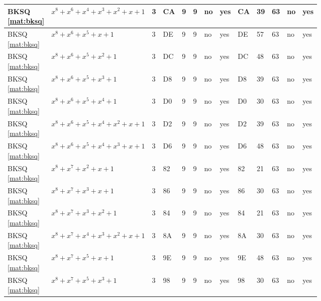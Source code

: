 \begin{tiny}
\begin{longtable}{|l|l|l|l|l|l|l|l|l|l|l|l|l|}
\shortstack{BKSQ \\ \eqref{mat:bksq}} & $x^8 + x^6 + x^4 + x^3 + x^2 + x + 1$ & 3 & CA & 9 & 9 & no & yes & CA & 39 & 63 & no & yes \\ \hline
\shortstack{BKSQ \\ \eqref{mat:bksq}} & $x^8 + x^6 + x^5 + x + 1$ & 3 & DE & 9 & 9 & no & yes & DE & 57 & 63 & no & yes \\ \hline
\shortstack{BKSQ \\ \eqref{mat:bksq}} & $x^8 + x^6 + x^5 + x^2 + 1$ & 3 & DC & 9 & 9 & no & yes & DC & 48 & 63 & no & yes \\ \hline
\shortstack{BKSQ \\ \eqref{mat:bksq}} & $x^8 + x^6 + x^5 + x^3 + 1$ & 3 & D8 & 9 & 9 & no & yes & D8 & 39 & 63 & no & yes \\ \hline
\shortstack{BKSQ \\ \eqref{mat:bksq}} & $x^8 + x^6 + x^5 + x^4 + 1$ & 3 & D0 & 9 & 9 & no & yes & D0 & 30 & 63 & no & yes \\ \hline
\shortstack{BKSQ \\ \eqref{mat:bksq}} & $x^8 + x^6 + x^5 + x^4 + x^2 + x + 1$ & 3 & D2 & 9 & 9 & no & yes & D2 & 39 & 63 & no & yes \\ \hline
\shortstack{BKSQ \\ \eqref{mat:bksq}} & $x^8 + x^6 + x^5 + x^4 + x^3 + x + 1$ & 3 & D6 & 9 & 9 & no & yes & D6 & 48 & 63 & no & yes \\ \hline
\shortstack{BKSQ \\ \eqref{mat:bksq}} & $x^8 + x^7 + x^2 + x + 1$ & 3 & 82 & 9 & 9 & no & yes & 82 & 21 & 63 & no & yes \\ \hline
\shortstack{BKSQ \\ \eqref{mat:bksq}} & $x^8 + x^7 + x^3 + x + 1$ & 3 & 86 & 9 & 9 & no & yes & 86 & 30 & 63 & no & yes \\ \hline
\shortstack{BKSQ \\ \eqref{mat:bksq}} & $x^8 + x^7 + x^3 + x^2 + 1$ & 3 & 84 & 9 & 9 & no & yes & 84 & 21 & 63 & no & yes \\ \hline
\shortstack{BKSQ \\ \eqref{mat:bksq}} & $x^8 + x^7 + x^4 + x^3 + x^2 + x + 1$ & 3 & 8A & 9 & 9 & no & yes & 8A & 30 & 63 & no & yes \\ \hline
\shortstack{BKSQ \\ \eqref{mat:bksq}} & $x^8 + x^7 + x^5 + x + 1$ & 3 & 9E & 9 & 9 & no & yes & 9E & 48 & 63 & no & yes \\ \hline
\shortstack{BKSQ \\ \eqref{mat:bksq}} & $x^8 + x^7 + x^5 + x^3 + 1$ & 3 & 98 & 9 & 9 & no & yes & 98 & 30 & 63 & no & yes \\ \hline

\end{longtable}
\end{tiny}
